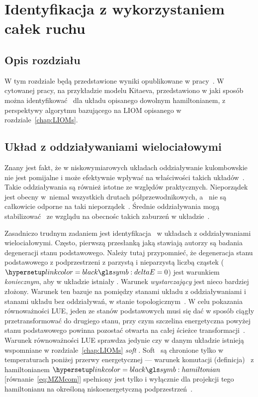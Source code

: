 \chapter{Identyfikacja z wykorzystaniem całek ruchu}\label{chap:identification}

\section*{Opis rozdziału}

W tym rozdziale będą przedstawione wyniki opublikowane w pracy~\cite{wieckowski.maska.2018}.
W cytowanej pracy, na przykładzie modelu Kitaeva, przedstawiono w jaki sposób można identyfikować \MZM\ dla układu opisanego dowolnym hamiltonianem, z perspektywy algorytmu bazującego na \acrshort{LIOM} opisanego w rozdziale~\ref{chap:LIOMs}.

\section{Układ  z oddziaływaniami wielociałowymi}

Znany jest fakt, że w niskowymiarowych układach oddziaływanie kulombowskie nie jest pomijalne i może efektywnie wpływać na właściwości takich układów~\cite{haldane.1981,gangadharaiah.braunecker.2011,manolescu.marinescu.2014,vuik.eeltink.2016,dominguez.cayao.2017}.
Takie oddziaływania są również istotne ze względów praktycznych.
Nieporządek jest obecny w~niemal wszystkich drutach półprzewodnikowych, a \MZM\ nie są całkowicie odporne na taki nieporządek~\cite{lutchyn.stanescu.2011,akhmerov.dahlhaus.2011,maska.gorczyca.2017}.
Średnie oddziaływania mogą stabilizować \MZM\ ze wzglądu na obecnośc takich zaburzeń w układzie~\cite{stoudenmire.alicea.2011,hassler.schuricht.2012,gergs.fritz.2016,dominguez.cayao.2017}.

Zasadniczo trudnym zadaniem jest identyfikacja \MZM\ w układach z oddziaływaniami wielociałowymi.
Często, pierwszą przesłanką jaką stawiają autorzy są badania degeneracji stanu podstawowego.
Należy tutaj przypomnieć, że degeneracja stanu podstawowego z podprzestrzeni z parzystą i nieparzystą liczbą cząstek ($\deltaE=0$) jest warunkiem \textit{koniecznym}, aby w układzie istniały \MZM.
Warunek \textit{wystarczający} jest nieco bardziej złożony.
Warunek ten bazuje na  pomiędzy stanami układu z oddziaływaniami i stanami układu bez oddziaływań, w stanie topologicznym~\cite{chen.gu.2011}.
W celu pokazania równoważności \acrshort{LUE}, jeden ze stanów podstawowych musi się dać w sposób ciągły przetransformować do drugiego stanu, przy czym szczelina energetyczna powyżej stanu podstawowego powinna pozostać otwarta na całej ścieżce transformacji~\cite{fidkowski.kitaev.2010,katsura.schuricht.2015}.
Warunek równoważności \acrshort{LUE} sprawdza jedynie czy w danym układzie istnieją wspomniane w rozdziale~\ref{chap:LIOMs} \textit{soft} \MZM.
Soft \MZM\ są chronione tylko w temperaturach poniżej przerwy energetycznej --- warunek komutacji (definicja) \MZM\ z hamiltonianem $\hatH$ [równanie~\eqref{eq:MZMcom}] spełniony jest tylko i wyłącznie dla projekcji tego hamiltonianu na określoną niskoenergetyczną podprzestrzeń~\cite{alicea.fendley.2016}.

